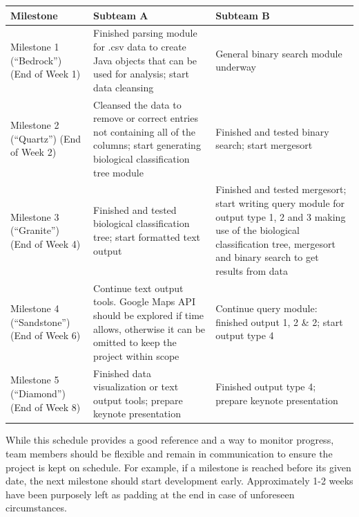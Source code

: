 \documentclass{article}
\begin{document}
\begin{table}[h]
	\centering
	\begin{tabular}{p{0.16\hsize}p{0.38\hsize}p{0.38\hsize}}
		\toprule
		\textbf{Milestone} & \textbf{Subteam A} & \textbf{Subteam B}\\
		\midrule
		Milestone 1 \newline (``Bedrock'') \newline(End of Week 1)
		& Finished parsing module for .csv data to create Java objects that can be used for analysis; start data cleansing
		& General binary search module underway \\
		\midrule
		Milestone 2 \newline (``Quartz'') \newline(End of Week 2)
		& Cleansed the data to remove or correct entries not containing all of the columns; start generating biological classification tree module
		& Finished and tested binary search; start mergesort \\
		\midrule
		Milestone 3 \newline (``Granite'') \newline(End of Week 4)
		& Finished and tested biological classification tree; start formatted text output
		& Finished and tested mergesort; start writing query module for output type 1, 2 and 3 making use of the biological classification tree, mergesort and binary search to get results from data \\
		\midrule
		Milestone 4 \newline (``Sandstone'') \newline(End of Week 6)
		& Continue text output tools. Google Maps API should be explored if time allows, otherwise it can be omitted to keep the project within scope
		& Continue query module: finished output 1,  2 \& 2; start output type 4\\
		\midrule
		Milestone 5 \newline (``Diamond'') \newline(End of Week 8)
		& Finished data visualization or text output tools; prepare keynote presentation
		& Finished output type 4; prepare keynote presentation \\		
		\bottomrule
	\end{tabular}
\end{table}

\noindent While this schedule provides a good reference and a way to monitor progress, team members should be flexible and remain in communication to ensure the project is kept on schedule. For example, if a milestone is reached before its given date, the next milestone should start development early. Approximately 1-2 weeks have been purposely left as padding at the end in case of unforeseen circumstances.
\end{document}
